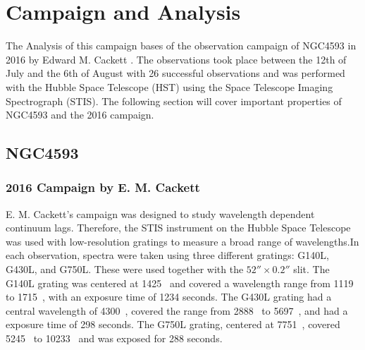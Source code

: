 \chapter{Campaign and Analysis}
\label{campaign_and_analysis}
The Analysis of this campaign bases of the observation campaign of NGC4593 in 2016 by Edward M. Cackett \cite{cackett2018accretion}. The observations took place between the 12th of July and the 6th of August with 26 successful observations and was performed with the Hubble Space Telescope (HST) using the Space Telescope Imaging Spectrograph (STIS). The following section will cover important properties of NGC4593 and the 2016 campaign.

\section{NGC4593}
\label{NGC4593}

\subsection{2016 Campaign by E. M. Cackett}
\label{Campaign_Cackett}

E. M. Cackett's campaign was designed to study wavelength dependent continuum lags. Therefore, the STIS instrument on the Hubble Space Telescope was used with low-resolution gratings to measure a broad range of wavelengths.In each observation, spectra were taken using three different gratings: G140L, G430L, and G750L. These were used together with the $52'' \times 0.2''$ slit.
The G140L grating was centered at 1425~\text{\AA} and covered a wavelength range from 1119~\text{\AA} to 1715~\text{\AA}, with an exposure time of 1234 seconds. The G430L grating had a central wavelength of 4300~\text{\AA}, covered the range from 2888~\text{\AA} to 5697~\text{\AA}, and had a exposure time of 298 seconds. The G750L grating, centered at 7751~\text{\AA}, covered 5245~\text{\AA} to 10233~\text{\AA} and was exposed for 288 seconds.
